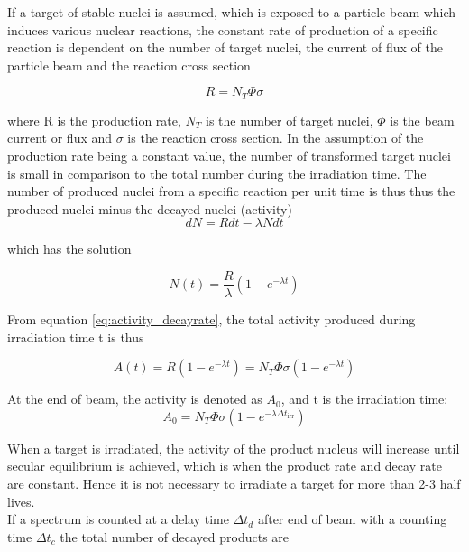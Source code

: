 \noindent 
If a target of stable nuclei is assumed, which is exposed to a particle beam which induces various nuclear reactions, the constant rate of production of a specific reaction is dependent on the number of target nuclei, the current of flux of the particle beam and the reaction cross section

\begin{equation}
    R = N_T \Phi \sigma
\end{equation}

\noindent 
where R is the production rate, $N_T$ is the number of target nuclei, $\Phi$ is the beam current or flux and $\sigma$ is the reaction cross section. In the assumption of the production rate being a constant value, the number of transformed target nuclei is small in comparison to the total number during the irradiation time. The number of produced nuclei from a specific reaction per unit time is thus thus the produced nuclei minus the decayed nuclei (activity)
\begin{equation}
    dN = Rdt - \lambda N dt
\end{equation}

which has the solution

\begin{equation}
    N(t) = \frac{R}{\lambda}(1-e^{-\lambda t})
\end{equation}

From equation \ref{eq:activity_decayrate}, the total activity produced during irradiation time t is thus 

\begin{equation} 
    A(t) = R(1-e^{-\lambda t}) = N_T \Phi \sigma (1-e^{-\lambda t})
\end{equation}

At the end of beam, the activity is denoted as $A_0$, and t is the irradiation time:
\begin{equation} \label{eq:activity_eob}
    A_0 = N_T \Phi \sigma (1-e^{-\lambda \Delta t_\text{irr}})
\end{equation}

\noindent 
When a target is irradiated, the activity of the product nucleus will increase until secular equilibrium is achieved, which is when the product rate and decay rate are constant. Hence it is not necessary to irradiate a target for more than 2-3 half lives.\\

\noindent 
If a spectrum is counted at a delay time $\Delta t_d$ after end of beam with a counting time $\Delta t_c$  the total number of decayed products are 

